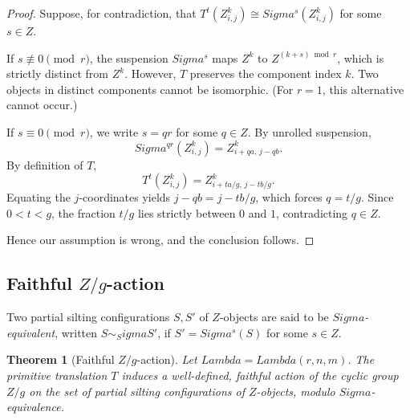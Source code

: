 \documentclass[11pt, a4paper]{article}
\newtheorem{theorem}{Theorem}[section]
\theoremstyle{definition}
\def\Lambda{Lambda}%
\def\Sigma{Sigma}%
\def\mathbb#1{#1}%
\def\mathcal#1{#1}%
\begin{document}
\begin{proof}
Suppose, for contradiction, that $T^t(Z_{i,j}^k) \cong \Sigma^s(Z_{i,j}^k)$ for some $s \in \mathbb Z$.

If $s \not\equiv 0 \pmod r$, the suspension $\Sigma^s$ maps $\mathcal Z^k$ to $\mathcal Z^{(k+s) \bmod r}$, which is strictly distinct from $\mathcal Z^k$. However, $T$ preserves the component index $k$. Two objects in distinct components cannot be isomorphic. (For $r=1$, this alternative cannot occur.)

If $s \equiv 0 \pmod r$, we write $s = qr$ for some $q \in \mathbb Z$. By unrolled suspension,
\[
  \Sigma^{qr}(Z_{i,j}^k) = Z_{i+qa,\, j-qb}^k.
\]
By definition of $T$,
\[
  T^t(Z_{i,j}^k) = Z_{i+t a/g,\, j-t b/g}^k.
\]
Equating the $j$-coordinates yields $j - qb = j - t b/g$, which forces $q = t/g$. Since $0 < t < g$, the fraction $t/g$ lies strictly between $0$ and $1$, contradicting $q \in \mathbb Z$.

Hence our assumption is wrong, and the conclusion follows.
\end{proof}

\subsection{Faithful \texorpdfstring{$\mathbb Z/g$}{Z/g}-action}\label{subsec:Taction-main}

Two partial silting configurations $S, S'$ of $\mathcal Z$-objects are said to be \emph{$\Sigma$-equivalent}, written $S \sim_\Sigma S'$, if $S' = \Sigma^s(S)$ for some $s \in \mathbb Z$.

\begin{theorem}[Faithful $\mathbb Z/g$-action]\label{thm:Zg-action}
Let $\Lambda = \Lambda(r,n,m)$. The primitive translation $T$ induces a well-defined, faithful action of the cyclic group $\mathbb Z/g$ on the set of partial silting configurations of $\mathcal Z$-objects, modulo $\Sigma$-equivalence.
\end{theorem}
\end{document}
